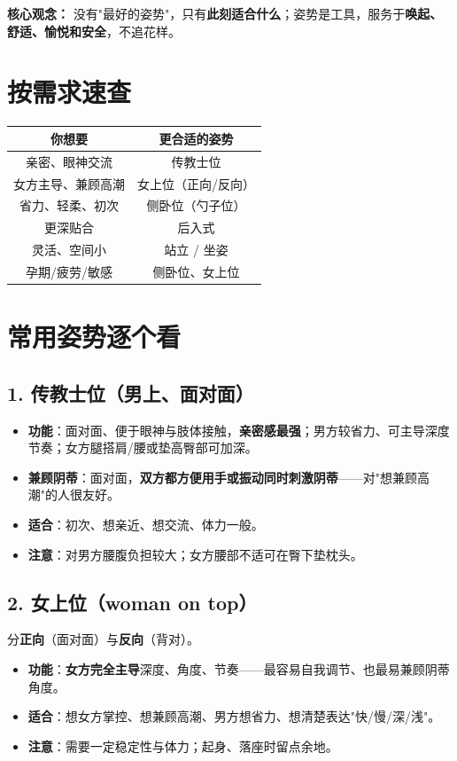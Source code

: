\documentclass[12pt,UTF8,openany]{ctexbook}
\begin{document}
\noindent\textbf{核心观念：} 没有"最好的姿势"，只有\textbf{此刻适合什么}；姿势是工具，服务于\textbf{唤起、舒适、愉悦和安全}，不追花样。

\section{按需求速查}

\begin{tabularx}{\textwidth}{C C}
\toprule
你想要 & 更合适的姿势 \\
\midrule
亲密、眼神交流 & 传教士位 \\
女方主导、兼顾高潮 & 女上位（正向/反向） \\
省力、轻柔、初次 & 侧卧位（勺子位） \\
更深贴合 & 后入式 \\
灵活、空间小 & 站立 / 坐姿 \\
孕期/疲劳/敏感 & 侧卧位、女上位 \\
\bottomrule
\end{tabularx}

\section{常用姿势逐个看}

\subsection*{1. 传教士位（男上、面对面）}
\begin{itemize}[leftmargin=2em,itemsep=0.3em]
  \item \textbf{功能}：面对面、便于眼神与肢体接触，\textbf{亲密感最强}；男方较省力、可主导深度节奏；女方腿搭肩/腰或垫高臀部可加深。
  \item \textbf{兼顾阴蒂}：面对面，\textbf{双方都方便用手或振动同时刺激阴蒂}——对"想兼顾高潮"的人很友好。
  \item \textbf{适合}：初次、想亲近、想交流、体力一般。
  \item \textbf{注意}：对男方腰腹负担较大；女方腰部不适可在臀下垫枕头。
\end{itemize}

\subsection*{2. 女上位（woman on top）}

分\textbf{正向}（面对面）与\textbf{反向}（背对）。
\begin{itemize}[leftmargin=2em,itemsep=0.3em]
  \item \textbf{功能}：\textbf{女方完全主导}深度、角度、节奏——最容易自我调节、也最易兼顾阴蒂角度。
  \item \textbf{适合}：想女方掌控、想兼顾高潮、男方想省力、想清楚表达"快/慢/深/浅"。
  \item \textbf{注意}：需要一定稳定性与体力；起身、落座时留点余地。
\end{itemize}
\end{document}
